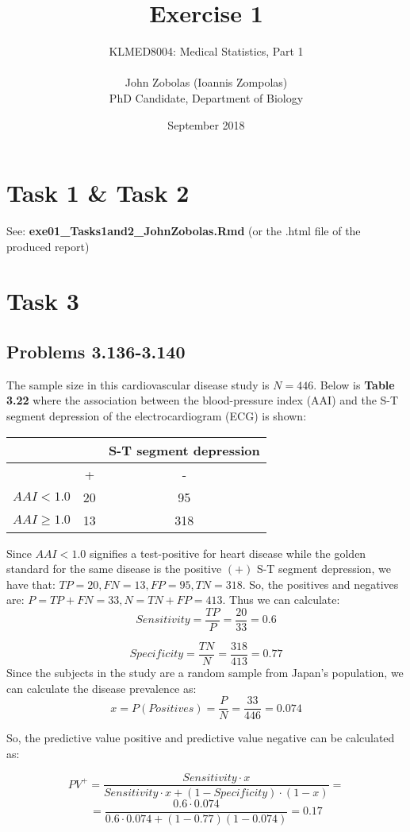 \documentclass[12pt,a4paper]{article}
\title{Exercise 1}
\author{KLMED8004: Medical Statistics, Part 1\\\\ John Zobolas (Ioannis Zompolas)\\ PhD Candidate, Department of Biology}
\date{September 2018}
\begin{document}
\maketitle

\section*{Task 1 \& Task 2}
See: \textbf{exe01\_Tasks1and2\_JohnZobolas.Rmd}
(or the .html file of the produced report)

\section*{Task 3}

\subsection*{Problems 3.136-3.140}
The sample size in this cardiovascular disease study is $N=446$. Below is \textbf{Table 3.22} where the association between the blood-pressure index (AAI) and the S-T segment depression of the electrocardiogram (ECG) is shown:

\begin{center}
\begin{tabular}{ c c c }
 & & S-T segment depression \\ \hline
 & + & - \\ \hline  
 $AAI < 1.0$ & 20 & 95 \\
 $AAI \geq 1.0$ & 13 & 318 
\end{tabular}
\end{center}

Since $AAI < 1.0$ signifies a test-positive for heart disease while the golden standard for the same disease is the positive $(+)$ S-T segment depression, we have that: $TP=20, FN=13, FP=95, TN =318$.
So, the positives and negatives are: $P=TP+FN=33, N=TN+FP=413$. 
Thus we can calculate:
$$Sensitivity=\frac{TP}{P}=\frac{20}{33}=0.6$$

$$Specificity=\frac{TN}{N}=\frac{318}{413}=0.77$$
Since the subjects in the study are a random sample from Japan's population, we can calculate the disease prevalence as:
$$x=P(Positives)=\frac{P}{N}=\frac{33}{446}=0.074$$

So, the predictive value positive and predictive value negative can be calculated as:

$$PV^+=\frac{Sensitivity\cdot x}{Sensitivity\cdot x + (1-Specificity)\cdot (1-x)}=$$
$$=\frac{0.6\cdot 0.074}{0.6\cdot 0.074 + (1-0.77)(1-0.074)}=0.17$$
\end{document}
